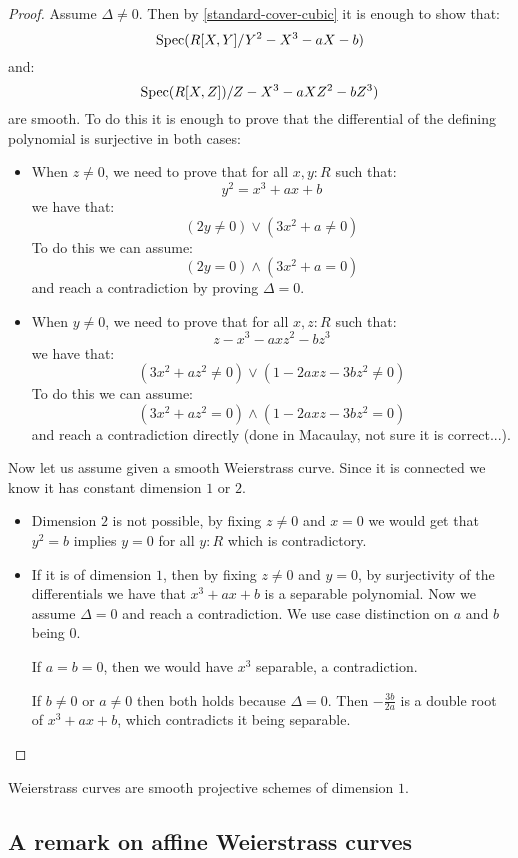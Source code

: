 \begin{proof}
Assume $\Delta\not=0$. Then by \cref{standard-cover-cubic} it is enough to show that:
\[\operatorname{Spec}(R[X,Y]/Y^2-X^3-aX-b)\]
and:
\[\operatorname{Spec}(R[X,Z])/Z-X^3-aXZ^2-bZ^3)\]
are smooth. To do this it is enough to prove that the differential of the defining polynomial is surjective in both cases:
\begin{itemize}
\item When $z\not=0$, we need to prove that for all $x,y:R$ such that:
\[y^2 = x^3+ a x + b\]
we have that:
\[(2y\not=0) \lor (3x^2 + a \not= 0)\]
To do this we can assume:
\[(2y=0)\land(3x^2+a=0)\]
and reach a contradiction by proving $\Delta=0$.
\item When $y\not=0$, we need to prove that for all $x,z:R$ such that:
\[z-x^3-axz^2-bz^3\]
we have that:
\[(3x^2+az^2 \not= 0)\lor (1-2axz-3bz^2 \not=0)\]
To do this we can assume:
\[(3x^2+az^2 = 0)\land (1-2axz-3bz^2 =0)\]
and reach a contradiction directly (done in Macaulay, not sure it is correct...).
\end{itemize}
Now let us assume given a smooth Weierstrass curve. Since it is connected we know it has constant dimension $1$ or $2$.
\begin{itemize}
\item Dimension $2$ is not possible, by fixing $z\not=0$ and $x=0$ we would get that $y^2=b$ implies $y=0$ for all $y:R$ which is contradictory.
\item If it is of dimension $1$, then by fixing $z\not=0$ and $y=0$, by surjectivity of the differentials we have that $x^3+ a x + b$ is a separable polynomial. Now we assume $\Delta=0$ and reach a contradiction. We use case distinction on $a$ and $b$ being $0$.

If $a=b=0$, then we would have $x^3$ separable, a contradiction.

If $b\not=0$ or $a\not=0$ then both holds because $\Delta=0$. Then $-\frac{3b}{2a}$ is a double root of $x^3+ a x + b$, which contradicts it being separable.
\end{itemize}
\end{proof}

\begin{corollary}
Weierstrass curves are smooth projective schemes of dimension $1$.
\end{corollary}

\subsection{A remark on affine Weierstrass curves}

